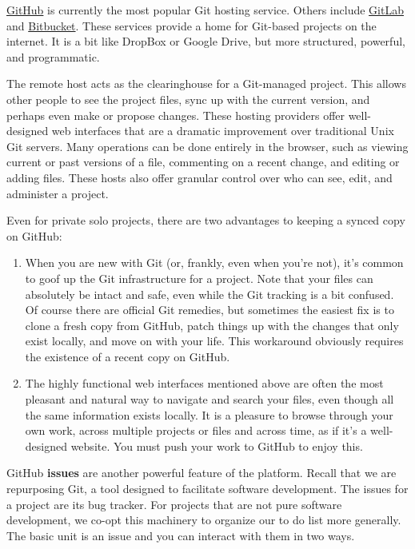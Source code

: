 \documentclass[12pt]{article}
\providecommand{\tightlist}{%
  \setlength{\itemsep}{0pt}\setlength{\parskip}{0pt}}
\begin{document}
\href{https://github.com}{GitHub} is currently the most popular Git
hosting service. Others include \href{https://about.gitlab.com}{GitLab}
and \href{https://bitbucket.org}{Bitbucket}. These services provide a
home for Git-based projects on the internet. It is a bit like DropBox or
Google Drive, but more structured, powerful, and programmatic.

The remote host acts as the clearinghouse for a Git-managed project.
This allows other people to see the project files, sync up with the
current version, and perhaps even make or propose changes. These hosting
providers offer well-designed web interfaces that are a dramatic
improvement over traditional Unix Git servers. Many operations can be
done entirely in the browser, such as viewing current or past versions
of a file, commenting on a recent change, and editing or adding files.
These hosts also offer granular control over who can see, edit, and
administer a project.

Even for private solo projects, there are two advantages to keeping a
synced copy on GitHub:

\begin{enumerate}
\def\labelenumi{\arabic{enumi}.}
\tightlist
\item
  When you are new with Git (or, frankly, even when you're not), it's
  common to goof up the Git infrastructure for a project. Note that your
  files can absolutely be intact and safe, even while the Git tracking
  is a bit confused. Of course there are official Git remedies, but
  sometimes the easiest fix is to clone a fresh copy from GitHub, patch
  things up with the changes that only exist locally, and move on with
  your life. This workaround obviously requires the existence of a
  recent copy on GitHub.
\item
  The highly functional web interfaces mentioned above are often the
  most pleasant and natural way to navigate and search your files, even
  though all the same information exists locally. It is a pleasure to
  browse through your own work, across multiple projects or files and
  across time, as if it's a well-designed website. You must push your
  work to GitHub to enjoy this.
\end{enumerate}

GitHub \textbf{issues} are another powerful feature of the platform.
Recall that we are repurposing Git, a tool designed to facilitate
software development. The issues for a project are its bug tracker. For
projects that are not pure software development, we co-opt this
machinery to organize our to do list more generally. The basic unit is
an issue and you can interact with them in two ways.
\end{document}

